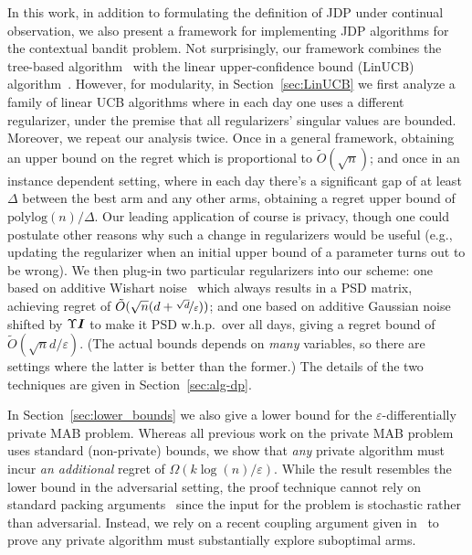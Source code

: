 \documentclass{article}
\newcommand{\Eye}[1][]{\bm{I}\notblank{#1}{_{{#1}\times{#1}}}{}}
\begin{document}
In this work, in addition to formulating the definition of JDP under
continual observation, we also present a framework for implementing
JDP algorithms for the contextual bandit problem. Not surprisingly,
our framework combines the tree-based algorithm~\cite{ChanPrivateContinualRelease2010,DworkContinualObservation2010}  with the linear
upper-confidence bound (LinUCB) algorithm~\cite{DaniStochasticLinearOptimization2008}.  However, for modularity,
in Section~\ref{sec:LinUCB} we first analyze a family of linear UCB algorithms where in each
day one uses a different regularizer, under the premise that all
regularizers' singular values are bounded. Moreover, we repeat our analysis twice. Once in a general framework,
obtaining an upper bound on the regret which is proportional to
$\tilde O(\sqrt n)$; and once in an instance dependent setting, where in each
day there's a significant gap of at least $\Delta$ between the best arm and any other
arms, obtaining a regret upper bound of $\mathrm{polylog}(n)/\Delta$.
Our leading application of course is privacy, though
one could postulate other reasons why such a change in regularizers
would be useful (e.g., updating the regularizer when an initial upper
bound of a parameter turns out to be wrong). We then plug-in two
particular regularizers into our scheme: one based on additive Wishart
noise~\citep{SheffetPrivateApproxRegression2015} which always results
in a PSD matrix, achieving regret of $\tilde O(\sqrt{n}(d+\nicefrac{\sqrt d}{\varepsilon}))$; and one based on additive Gaussian
noise \citep{DworkAnalyzeGauss2014} shifted by $\Upsilon\Eye$ to make
it PSD w.h.p.\ over all days, giving a regret bound of $\tilde O(\sqrt n d/\varepsilon)$. (The actual bounds depends on \emph{many} variables, so there are settings where the latter is better than the former.) The details of the two techniques are given in Section~\ref{sec:alg-dp}.

In Section~\ref{sec:lower_bounds} we also give a lower bound for the $\varepsilon$-differentially private
MAB problem. Whereas all previous work on the private MAB problem uses standard (non-private) bounds, we show that
\emph{any} private algorithm must incur \emph{an additional} regret of
$\Omega(k\log(n)/\varepsilon)$. While the result resembles the lower bound in the
adversarial setting, the proof technique cannot rely on standard packing arguments~\citep[e.g.][]{HardtTalwarGeometryDP2010} since the input for the
problem is stochastic rather than adversarial.  Instead, we rely on a recent coupling argument given in~\cite{KarwaVadhanFiniteSampleDP2017} to prove any private algorithm must substantially explore suboptimal arms.
\end{document}
